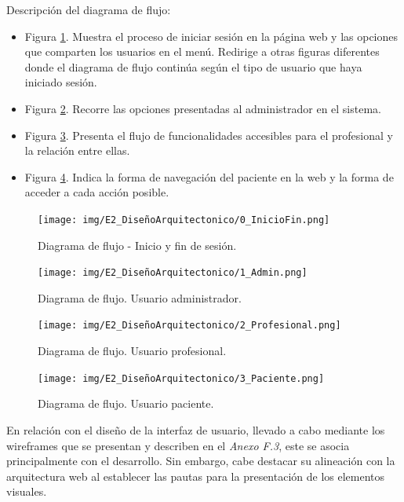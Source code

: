 Descripción del diagrama de flujo:
\begin{itemize}
    \item Figura \ref{fig:0_InicioFin}. Muestra el proceso de iniciar sesión en la página web y las opciones que comparten los usuarios en el menú. Redirige a otras figuras diferentes donde el diagrama de flujo continúa según el tipo de usuario que haya iniciado sesión.
    \item Figura \ref{fig:1_Admin}. Recorre las opciones presentadas al administrador en el sistema.
    \item Figura \ref{fig:2_Profesional}. Presenta el flujo de funcionalidades accesibles para el profesional y la relación entre ellas.
    \item Figura \ref{fig:3_Paciente}. Indica la forma de navegación del paciente en la web y la forma de acceder a cada acción posible.
\end{itemize}


\begin{figure}[h]
    \centering
    \texttt{[image: img/E2\_DiseñoArquitectonico/0\_InicioFin.png]}
    \caption{Diagrama de flujo - Inicio y fin de sesión.}
    \label{fig:0_InicioFin}
\end{figure}

\begin{figure}[h]
    \centering
    \texttt{[image: img/E2\_DiseñoArquitectonico/1\_Admin.png]}
    \caption{Diagrama de flujo. Usuario administrador.}
    \label{fig:1_Admin}
\end{figure}

\begin{figure}[h]
    \centering
    \texttt{[image: img/E2\_DiseñoArquitectonico/2\_Profesional.png]}
    \caption{Diagrama de flujo. Usuario profesional.}
    \label{fig:2_Profesional}
\end{figure}

\begin{figure}[h]
    \centering
    \texttt{[image: img/E2\_DiseñoArquitectonico/3\_Paciente.png]}
    \caption{Diagrama de flujo. Usuario paciente.}
    \label{fig:3_Paciente}
\end{figure}


En relación con el diseño de la interfaz de usuario, llevado a cabo mediante los wireframes que se presentan y describen en el \textit{Anexo F.3}, este se asocia principalmente con el desarrollo. Sin embargo, cabe destacar su alineación con la arquitectura web al establecer las pautas para la presentación de los elementos visuales.
